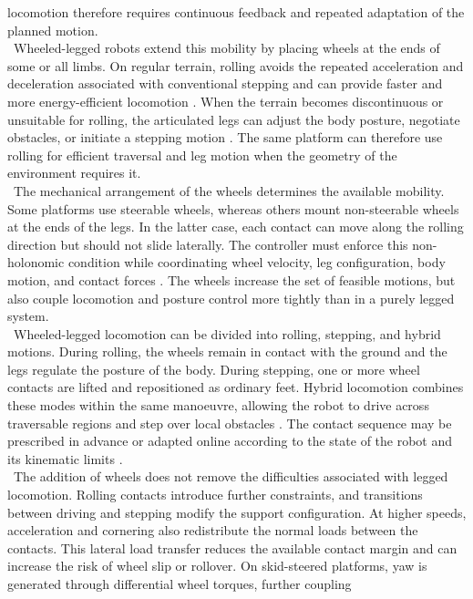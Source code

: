 locomotion therefore requires continuous feedback and repeated adaptation of
the planned motion.\\
\
Wheeled-legged robots extend this mobility by placing wheels at the ends of
some or all limbs. On regular terrain, rolling avoids the repeated
acceleration and deceleration associated with conventional stepping and can
provide faster and more energy-efficient locomotion
\cite{wheeled_legged_survey,keep_rollin}. When the terrain becomes
discontinuous or unsuitable for rolling, the articulated legs can adjust the
body posture, negotiate obstacles, or initiate a stepping motion
\cite{rolling_deep}. The same platform can therefore use rolling for efficient
traversal and leg motion when the geometry of the environment requires it.\\
\
The mechanical arrangement of the wheels determines the available mobility.
Some platforms use steerable wheels, whereas others mount non-steerable wheels
at the ends of the legs. In the latter case, each contact can move along the
rolling direction but should not slide laterally. The controller must enforce
this non-holonomic condition while coordinating wheel velocity, leg
configuration, body motion, and contact forces
\cite{keep_rollin,wheeled_whole_body_mpc}. The wheels increase the set of
feasible motions, but also couple locomotion and posture control more tightly
than in a purely legged system.\\
\
Wheeled-legged locomotion can be divided into rolling, stepping, and hybrid
motions. During rolling, the wheels remain in contact with the ground and the
legs regulate the posture of the body. During stepping, one or more wheel
contacts are lifted and repositioned as ordinary feet. Hybrid locomotion
combines these modes within the same manoeuvre, allowing the robot to drive
across traversable regions and step over local obstacles
\cite{rolling_deep}. The contact sequence may be prescribed in advance or
adapted online according to the state of the robot and its kinematic limits
\cite{wheeled_whole_body_mpc}.\\
\
The addition of wheels does not remove the difficulties associated with legged
locomotion. Rolling contacts introduce further constraints, and transitions
between driving and stepping modify the support configuration. At higher
speeds, acceleration and cornering also redistribute the normal loads between
the contacts. This lateral load transfer reduces the available contact margin
and can increase the risk of wheel slip or rollover. On skid-steered platforms,
yaw is generated through differential wheel torques, further coupling
